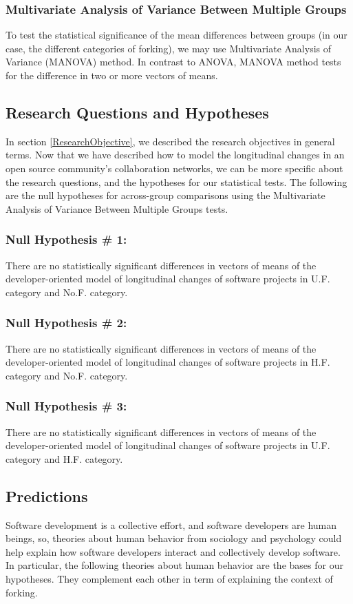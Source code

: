 \documentclass[11pt]{report}
\begin{document}
\subsubsection{Multivariate Analysis of Variance Between Multiple Groups}
\label{MANOVA}
To test the statistical significance of the mean differences between groups (in our case, the different categories of forking), we may use Multivariate Analysis of Variance (MANOVA) method. In contrast to ANOVA, MANOVA method tests for the difference in two or more vectors of means. 

\subsection{Research Questions and Hypotheses}
\label{RQs}
In section \ref{ResearchObjective}, we described the research objectives in general terms. Now that we have described how to model the longitudinal changes in an open source community's collaboration networks, we can be more specific about the research questions, and the hypotheses for our statistical tests. The following are the null hypotheses for across-group comparisons using the Multivariate Analysis of Variance Between Multiple Groups tests.

\subsubsection{Null Hypothesis \# 1:} 
There are no statistically significant differences in vectors of means of the developer-oriented model of longitudinal changes of software projects in U.F. category and No.F. category.

\subsubsection{Null Hypothesis \# 2:} 
There are no statistically significant differences in vectors of means of the developer-oriented model of longitudinal changes of software projects in H.F. category and No.F. category.

\subsubsection{Null Hypothesis \# 3:} 
There are no statistically significant differences in vectors of means of the developer-oriented model of longitudinal changes of software projects in U.F. category and H.F. category.


\subsection{Predictions}
Software development is a collective effort, and software developers are human beings, so, theories about human behavior from sociology and psychology could help explain how software developers interact and collectively develop software. In particular, the following theories about human behavior are the bases for our hypotheses. They complement each other in term of explaining the context of forking.
\end{document}
